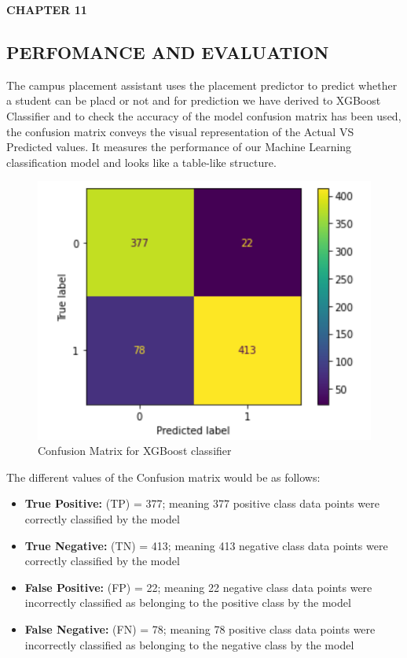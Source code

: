 \documentclass[12pt]{article}
\begin{document}
\begin{flushleft}\textbf{CHAPTER 11} \end{flushleft}
\begin{flushleft}\section{PERFOMANCE AND EVALUATION} \end{flushleft}
The campus placement assistant uses the placement predictor to predict whether a student can be placd or not and for prediction we have derived to  XGBoost Classifier and to check the accuracy of the model confusion matrix has been used, the confusion matrix conveys the visual representation of the Actual VS Predicted values. It measures the performance of our Machine Learning classification model and looks like a table-like structure.
\begin{figure}[H]
\begin{center}
\includegraphics[scale=.4]{ResultP1}
\caption{Confusion Matrix for XGBoost classifier}
\end{center}
\end{figure}
The different values of the Confusion matrix would be as follows:
\begin{itemize}
\item \textbf{True Positive:} (TP) = 377; meaning 377 positive class data points were correctly classified by the model
\item \textbf{True Negative:} (TN) = 413; meaning 413 negative class data points were correctly classified by the model
\item \textbf{False Positive:} (FP) = 22; meaning 22 negative class data points were incorrectly classified as belonging to the positive class by the model
\item \textbf{False Negative:} (FN) = 78; meaning 78 positive class data points were incorrectly classified as belonging to the negative class by the model
\end {itemize}
\end{document}

